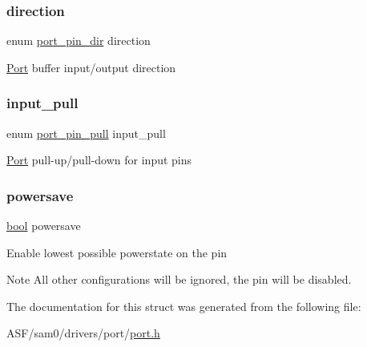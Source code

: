 \subsubsection{\texorpdfstring{direction}{direction}}
{\footnotesize\ttfamily enum \mbox{\hyperlink{group__asfdoc__sam0__port__group_gabe12893c067f9b011ece79c1bf1b128a}{port\+\_\+pin\+\_\+dir}} direction}

\mbox{\hyperlink{struct_port}{Port}} buffer input/output direction \mbox{\label{structport__config_a6f6186e550173a51258e1a2167160761}} 
\subsubsection{\texorpdfstring{input\_pull}{input\_pull}}
{\footnotesize\ttfamily enum \mbox{\hyperlink{group__asfdoc__sam0__port__group_ga1f47828261f5b7ac5f864b42981a2004}{port\+\_\+pin\+\_\+pull}} input\+\_\+pull}

\mbox{\hyperlink{struct_port}{Port}} pull-\/up/pull-\/down for input pins \mbox{\label{structport__config_afbc3e052896051a278a5ad17f6a6e2bb}} 
\subsubsection{\texorpdfstring{powersave}{powersave}}
{\footnotesize\ttfamily \mbox{\hyperlink{group__group__sam0__utils_ga97a80ca1602ebf2303258971a2c938e2}{bool}} powersave}

Enable lowest possible powerstate on the pin

\begin{DoxyNote}{Note}
All other configurations will be ignored, the pin will be disabled. 
\end{DoxyNote}


The documentation for this struct was generated from the following file\+:\begin{DoxyCompactItemize}
\item 
A\+S\+F/sam0/drivers/port/\mbox{\hyperlink{drivers_2port_2port_8h}{port.\+h}}\end{DoxyCompactItemize}
